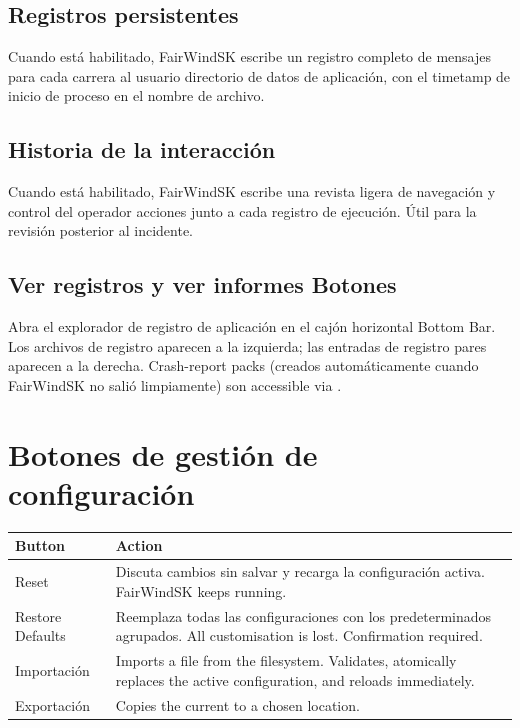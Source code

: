 \subsection{Registros persistentes}

Cuando está habilitado, FairWindSK escribe un registro completo de mensajes para cada carrera al usuario
directorio de datos de aplicación, con el timetamp de inicio de proceso en el nombre de archivo.

\subsection{Historia de la interacción}

Cuando está habilitado, FairWindSK escribe una revista ligera de navegación y control del operador
acciones junto a cada registro de ejecución.
Útil para la revisión posterior al incidente.

\subsection{Ver registros y ver informes Botones}

Abra el explorador de registro de aplicación en el cajón horizontal Bottom Bar.
Los archivos de registro aparecen a la izquierda; las entradas de registro pares aparecen a la derecha.
Crash-report packs (creados automáticamente cuando FairWindSK no salió limpiamente) son
accessible via .

\section{Botones de gestión de configuración}

\begin{longtable}{L{3.2cm}L{10.5cm}}
\toprule
{}
\color{white}\sffamily\bfseries Button &
\color{white}\sffamily\bfseries Action \\
\midrule
Reset&
Discuta cambios sin salvar y recarga la configuración activa.
  FairWindSK keeps running. \\
Restore Defaults&
Reemplaza todas las configuraciones con los predeterminados agrupados.
  All customisation is lost. Confirmation required. \\
Importación&
  Imports a  file from the filesystem.
  Validates, atomically replaces the active configuration, and reloads immediately. \\
Exportación&
  Copies the current  to a chosen location. \\
\bottomrule
\end{longtable}

